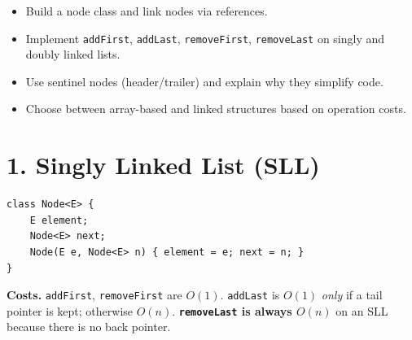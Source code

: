 \documentclass[11pt]{article}
\begin{document}

\begin{objbox}
\begin{itemize}[leftmargin=*]
  \item Build a node class and link nodes via references.
  \item Implement \texttt{addFirst}, \texttt{addLast}, \texttt{removeFirst}, \texttt{removeLast} on singly and doubly linked lists.
  \item Use sentinel nodes (header/trailer) and explain why they simplify code.
  \item Choose between array-based and linked structures based on operation costs.
\end{itemize}
\end{objbox}

\section*{1. Singly Linked List (SLL)}

\begin{center}
\end{center}

\begin{lstlisting}
class Node<E> {
    E element;
    Node<E> next;
    Node(E e, Node<E> n) { element = e; next = n; }
}
\end{lstlisting}

\textbf{Costs.} \texttt{addFirst}, \texttt{removeFirst} are $O(1)$. \texttt{addLast} is $O(1)$ \emph{only} if a tail pointer is kept; otherwise $O(n)$. \textbf{\texttt{removeLast} is always $O(n)$} on an SLL because there is no back pointer.
\end{document}
